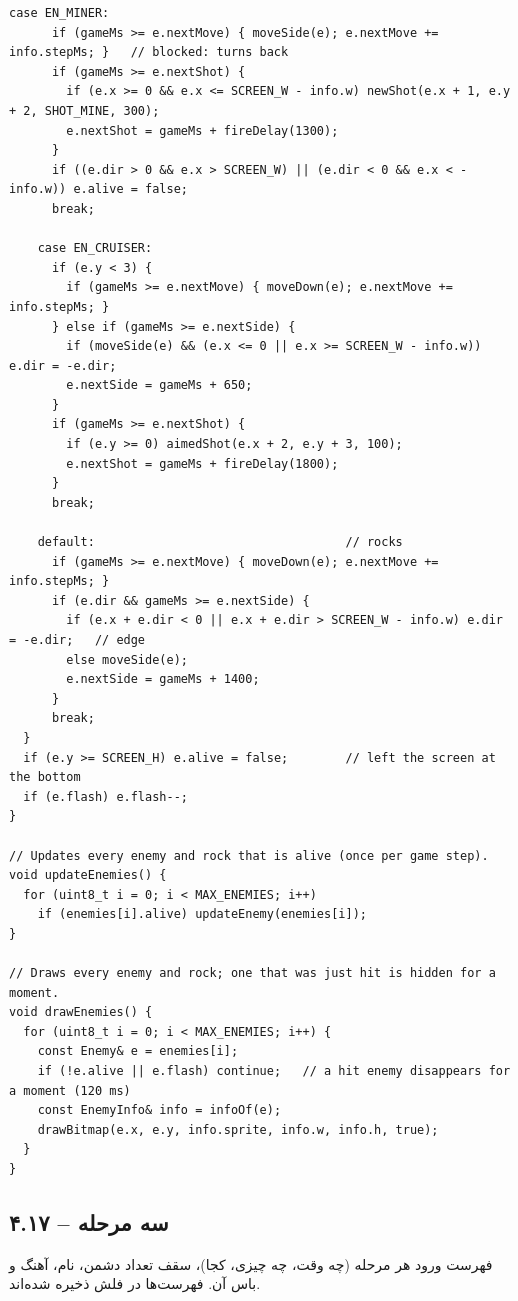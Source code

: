 \documentclass[11pt,a4paper]{article}
\begin{document}
\begin{latin}
\begin{lstlisting}[language=Arduino]
    case EN_MINER:
      if (gameMs >= e.nextMove) { moveSide(e); e.nextMove += info.stepMs; }   // blocked: turns back
      if (gameMs >= e.nextShot) {
        if (e.x >= 0 && e.x <= SCREEN_W - info.w) newShot(e.x + 1, e.y + 2, SHOT_MINE, 300);
        e.nextShot = gameMs + fireDelay(1300);
      }
      if ((e.dir > 0 && e.x > SCREEN_W) || (e.dir < 0 && e.x < -info.w)) e.alive = false;
      break;

    case EN_CRUISER:
      if (e.y < 3) {
        if (gameMs >= e.nextMove) { moveDown(e); e.nextMove += info.stepMs; }
      } else if (gameMs >= e.nextSide) {
        if (moveSide(e) && (e.x <= 0 || e.x >= SCREEN_W - info.w)) e.dir = -e.dir;
        e.nextSide = gameMs + 650;
      }
      if (gameMs >= e.nextShot) {
        if (e.y >= 0) aimedShot(e.x + 2, e.y + 3, 100);
        e.nextShot = gameMs + fireDelay(1800);
      }
      break;

    default:                                   // rocks
      if (gameMs >= e.nextMove) { moveDown(e); e.nextMove += info.stepMs; }
      if (e.dir && gameMs >= e.nextSide) {
        if (e.x + e.dir < 0 || e.x + e.dir > SCREEN_W - info.w) e.dir = -e.dir;   // edge
        else moveSide(e);
        e.nextSide = gameMs + 1400;
      }
      break;
  }
  if (e.y >= SCREEN_H) e.alive = false;        // left the screen at the bottom
  if (e.flash) e.flash--;
}

// Updates every enemy and rock that is alive (once per game step).
void updateEnemies() {
  for (uint8_t i = 0; i < MAX_ENEMIES; i++)
    if (enemies[i].alive) updateEnemy(enemies[i]);
}

// Draws every enemy and rock; one that was just hit is hidden for a moment.
void drawEnemies() {
  for (uint8_t i = 0; i < MAX_ENEMIES; i++) {
    const Enemy& e = enemies[i];
    if (!e.alive || e.flash) continue;   // a hit enemy disappears for a moment (120 ms)
    const EnemyInfo& info = infoOf(e);
    drawBitmap(e.x, e.y, info.sprite, info.w, info.h, true);
  }
}
\end{lstlisting}

\end{latin}

\clearpage
\subsection*{۴.۱۷  – سه مرحله}
فهرست ورود هر مرحله (چه وقت، چه چیزی، کجا)، سقف تعداد دشمن، نام، آهنگ و باس آن. فهرست‌ها در فلش ذخیره شده‌اند.
\end{document}

